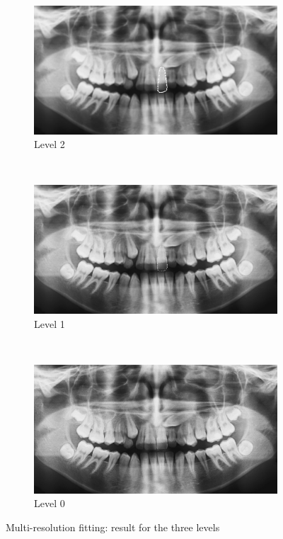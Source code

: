 \documentclass[a4paper,10pt]{article}
\begin{document}
\begin{figure}[htbp]
	\centering
	\begin{subfigure}{0.3\textwidth}
		\centering
		\includegraphics[width=1\textwidth, trim=280px 80px 240px 110px, clip]{level2}
		\caption{Level 2}
		\label{fig:level2}
	\end{subfigure}
	~
	\begin{subfigure}{0.3\textwidth}
		\centering
		\includegraphics[width=1\textwidth, trim=560px 160px 480px 220px, clip]{level1}
		\caption{Level 1}
		\label{fig:level1}
	\end{subfigure}
	~
	\begin{subfigure}{0.3\textwidth}
		\centering
		\includegraphics[width=1\textwidth, trim=1120px 320px 960px 440px, clip]{level0}
		\caption{Level 0}
		\label{fig:level0}
	\end{subfigure}
	\caption{Multi-resolution fitting: result for the three levels}
	\label{fig:multi_res}
\end{figure}
\end{document}
